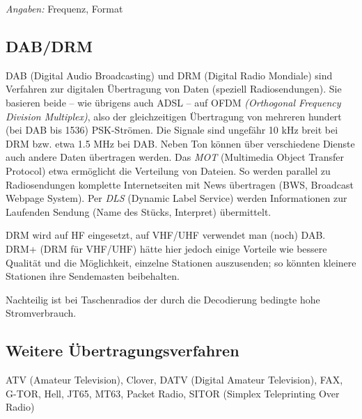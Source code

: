 \textit{Angaben:} Frequenz, Format

\subsection{DAB/DRM}
DAB (Digital Audio Broadcasting) und DRM (Digital Radio Mondiale) sind Verfahren zur digitalen Übertragung von Daten (speziell Radiosendungen). Sie basieren beide – wie übrigens auch ADSL – auf OFDM \textit{(Orthogonal Frequency Division Multiplex)}, also der gleichzeitigen Übertragung von mehreren hundert (bei DAB bis 1536) PSK-Strömen. Die Signale sind ungefähr 10 kHz breit bei DRM bzw. etwa 1.5 MHz bei DAB. Neben Ton können über verschiedene Dienste auch andere Daten übertragen werden. Das \textit{MOT} (Multimedia Object Transfer Protocol) etwa ermöglicht die Verteilung von Dateien. So werden parallel zu Radiosendungen komplette Internetseiten mit News übertragen (BWS, Broadcast Webpage System). Per \textit{DLS} (Dynamic Label Service) werden Informationen zur Laufenden Sendung (Name des Stücks, Interpret) übermittelt.

DRM wird auf HF eingesetzt, auf VHF/UHF verwendet man (noch) DAB. DRM+ (DRM für VHF/UHF) hätte hier jedoch einige Vorteile wie bessere Qualität und die Möglichkeit, einzelne Stationen auszusenden; so könnten kleinere Stationen ihre Sendemasten beibehalten.

Nachteilig ist bei Taschenradios der durch die Decodierung bedingte hohe Stromverbrauch.

\subsection{Weitere Übertragungsverfahren}
ATV (Amateur Television), Clover, DATV (Digital Amateur Television), FAX, G-TOR, Hell, JT65, MT63, Packet Radio, SITOR (Simplex Teleprinting Over Radio) 
